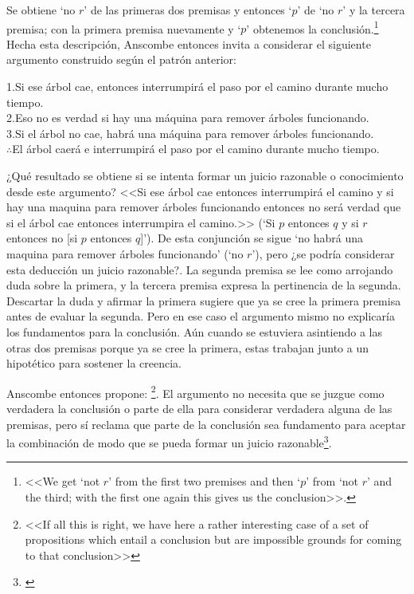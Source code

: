   Se obtiene `no $r$' de las primeras dos premisas y entonces `$p$' de `no $r$'
  y la tercera premisa; con la primera premisa nuevamente y `$p$' obtenemos la
  conclusión.{\footnote{\cite[299]{anscombe2015logic:qpa} <<We get `not $r$'
      from the first two premises and then `$p$' from `not $r$' and the third;
      with the first one again this gives us the conclusion>>.}} Hecha esta
  descripción, Anscombe entonces invita a considerar el siguiente argumento
  construido según el patrón anterior:
  \begin{adjustwidth}{1.2cm}{}
    1.\hspace{.459cm}Si ese árbol cae, entonces interrumpirá el paso por el camino
    durante mucho tiempo.\\
    2.\hspace{.459cm}Eso no es verdad si hay una máquina para remover árboles
    funcionando.\\
    3.\hspace{.459cm}Si el árbol no cae, habrá una máquina para remover árboles
    funcionando.\\
    $\therefore$\hspace{.459cm}El árbol caerá e interrumpirá el paso por el camino
    durante mucho tiempo.
  \end{adjustwidth}

  ¿Qué resultado se obtiene si se intenta formar un juicio razonable o
  conocimiento desde este argumento? <<Si ese árbol cae entonces interrumpirá el
  camino y si hay una maquina para remover árboles funcionando entonces no será
  verdad que si el árbol cae entonces interrumpira el camino.>> (`Si $p$
  entonces $q$ y si $r$ entonces no [si $p$ entonces $q$]'). De esta conjunción
  se sigue `no habrá una maquina para remover árboles funcionando' (`no $r$'),
  pero ¿se podría considerar esta deducción un juicio razonable?. La segunda
  premisa se lee como arrojando duda sobre la primera, y la tercera premisa
  expresa la pertinencia de la segunda. Descartar la duda y afirmar la primera
  sugiere que ya se cree la primera premisa antes de evaluar la segunda. Pero en
  ese caso el argumento mismo no explicaría los fundamentos para la conclusión.
  Aún cuando se estuviera asintiendo a las otras dos premisas porque ya se cree
  la primera, estas trabajan junto a un hipotético para sostener la
  creencia\autocite[Cf.~][300]{anscombe2015logic:qpa}.

  Anscombe entonces propone: \footnote{\cite[300]{anscombe2015logic:qpa} <<If all this is
    right, we have here a rather interesting case of a set of propositions which
    entail a conclusion but are impossible grounds for coming to that
    conclusion>>}. El argumento no necesita que se juzgue como verdadera la
  conclusión o parte de ella para considerar verdadera alguna de las premisas,
  pero sí reclama que parte de la conclusión sea fundamento para aceptar la
  combinación de modo que se pueda formar un juicio
  razonable\footnote{\cite[Cf.~][301]{anscombe2015logic:qpa}}.

